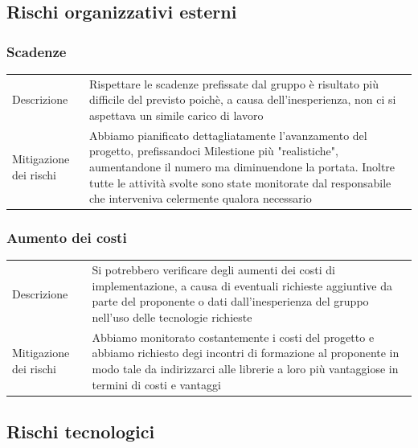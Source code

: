 \documentclass{article}
\begin{document}
\subsection{Rischi organizzativi esterni}
\subsubsection{Scadenze}
\begin{center}
\begin{tabular}{P{10em} P{20em}} 
     Descrizione & Rispettare le scadenze prefissate dal gruppo è risultato più difficile del previsto poichè, a causa dell'inesperienza, non ci si aspettava un simile carico di lavoro \\ 
    Mitigazione dei rischi &  Abbiamo pianificato dettagliatamente l'avanzamento del progetto, prefissandoci Milestione più "realistiche", aumentandone il numero ma diminuendone la portata. Inoltre tutte le attività svolte sono state monitorate dal responsabile che interveniva celermente qualora necessario\\
\end{tabular}
\label{tab:mitscadenze}
\end{center}

\subsubsection{Aumento dei costi}
\begin{center}
\begin{tabular}{P{10em} P{20em}} 
     Descrizione &  Si potrebbero verificare degli aumenti dei costi di implementazione, a causa di eventuali richieste aggiuntive da parte del proponente o dati dall'inesperienza del gruppo nell'uso delle tecnologie richieste\\ 
    Mitigazione dei rischi &  Abbiamo monitorato costantemente i costi del progetto e abbiamo richiesto degi incontri di formazione al proponente in modo tale da indirizzarci alle librerie a loro più vantaggiose in termini di costi e vantaggi\\
\end{tabular}
\label{tab:mitcosti}
\end{center}


\subsection{Rischi tecnologici}
\end{document}
